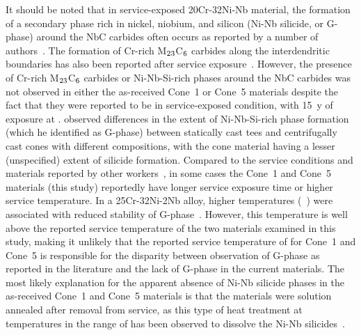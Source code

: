 {It should be noted that in service-exposed 20Cr-32Ni-Nb material, the formation of a secondary phase rich in nickel, niobium, and silicon (Ni-Nb silicide, or G-phase) around the NbC carbides often occurs as reported by a number of authors~\cite{shi_microstructure_2008,hoffman_high_2000-1,knowles_service_2004,patchett_welding_1998}. The formation of Cr-rich M$_\textnormal{23}$C$_\textnormal{6}$ carbides along the interdendritic boundaries has also been reported after service exposure~\cite{shi_microstructure_2008,patchett_welding_1998}. However, the presence of Cr-rich M$_\textnormal{23}$C$_\textnormal{6}$ carbides or Ni-Nb-Si-rich phases around the NbC carbides was not observed in either the as-received Cone~1 or Cone~5 materials despite the fact that they were reported to be in service-exposed condition, with 15~y of exposure at . \citet{hoffman_high_2000-1} observed differences in the extent of Ni-Nb-Si-rich phase formation (which he identified as G-phase) between statically cast tees and centrifugally cast cones with different compositions, with the cone material having a lesser (unspecified) extent of silicide formation. Compared to the service conditions and materials reported by other workers~\cite{hoffman_high_2000-1,patchett_welding_1998,knowles_service_2004,shi_microstructure_2008}, in some cases the Cone~1 and Cone~5 materials (this study) reportedly have longer service exposure time or higher service temperature. In a 25Cr-32Ni-2Nb alloy, higher temperatures (~) were associated with reduced stability of G-phase~\cite{de_almeida_soares_niobium_1992-1}. However, this temperature is well above the reported service temperature of the two materials examined in this study, making it unlikely that the reported service temperature of  for Cone~1 and Cone~5 is responsible for the disparity between observation of G-phase as reported in the literature and the lack of G-phase in the current materials. The most likely explanation for the apparent absence of Ni-Nb silicide phases in the as-received Cone~1 and Cone~5 materials is that the materials were solution annealed after removal from service, as this type of heat treatment at temperatures in the range of  has been observed to dissolve the Ni-Nb silicides~\cite{hoffman_high_2000-1,dewar_correlation_2013}.


}
